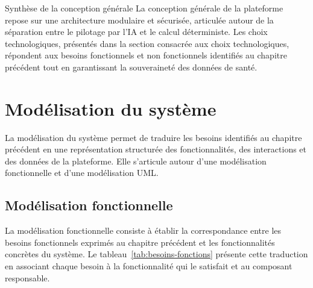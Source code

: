 \begin{infobox}{Synthèse de la conception générale}
La conception générale de la plateforme repose sur une architecture modulaire et sécurisée, articulée autour de la séparation entre le pilotage par l'IA et le calcul déterministe. Les choix technologiques, présentés dans la section consacrée aux choix technologiques, répondent aux besoins fonctionnels et non fonctionnels identifiés au chapitre précédent tout en garantissant la souveraineté des données de santé.
\end{infobox}

\section{Modélisation du système}

La modélisation du système permet de traduire les besoins identifiés au chapitre précédent en une représentation structurée des fonctionnalités, des interactions et des données de la plateforme. Elle s'articule autour d'une modélisation fonctionnelle et d'une modélisation UML.

\subsection{Modélisation fonctionnelle}

La modélisation fonctionnelle consiste à établir la correspondance entre les besoins fonctionnels exprimés au chapitre précédent et les fonctionnalités concrètes du système. Le tableau~\ref{tab:besoins-fonctions} présente cette traduction en associant chaque besoin à la fonctionnalité qui le satisfait et au composant responsable.

